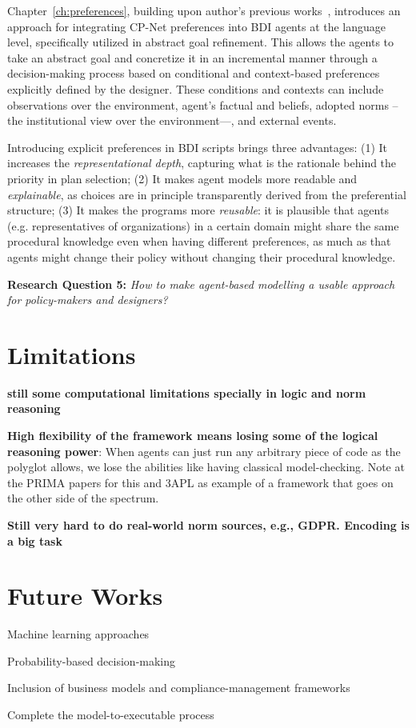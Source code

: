 Chapter~\ref{ch:preferences}, building upon author's previous works~\cite{Mohajeri2019,Mohajeri2020}, introduces an approach for integrating CP-Net preferences into BDI agents at the language level, specifically utilized in abstract goal refinement. This allows the agents to take an abstract goal and concretize it in an incremental manner through a decision-making process based on conditional and context-based preferences explicitly defined by the designer. These conditions and contexts can include observations over the environment, agent's factual and beliefs, adopted norms --the institutional view over the environment---, and external events. 

Introducing explicit preferences in BDI scripts brings three advantages: (1) It increases the \textit{representational depth}, capturing what is the rationale behind the priority in plan selection; (2) It makes agent models more readable and \textit{explainable}, as choices are in principle transparently derived from the preferential structure; (3) It makes the programs more \textit{reusable}: it is plausible  that agents (e.g. representatives of organizations) in a certain domain might share the same procedural knowledge even when having different preferences, as much as that  agents might change their policy without changing their procedural knowledge.





\begin{displayquote}
\textbf{Research Question 5:} \textit{How to make agent-based modelling a usable approach for policy-makers and designers?} 
\end{displayquote}




\section{Limitations}

\textbf{still some computational limitations specially in logic and norm reasoning}

\textbf{High flexibility of the framework means losing some of the logical reasoning power}: When agents can just run any arbitrary piece of code as the polyglot allows, we lose the abilities like having classical model-checking. Note at the PRIMA papers for this and 3APL as example of a framework that goes on the other side of the spectrum.

\textbf{Still very hard to do real-world norm sources, e.g., GDPR. Encoding is a big task}

\section{Future Works} 

Machine learning approaches

Probability-based decision-making

Inclusion of business models and compliance-management frameworks

Complete the model-to-executable process